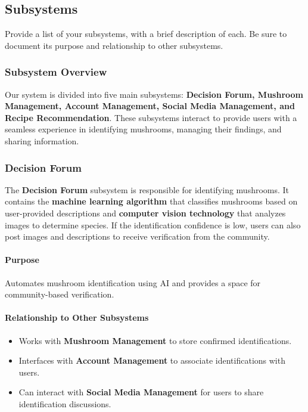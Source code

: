 \documentclass[]{article}
\begin{document}
\subsection{Subsystems}
\label{sub:subsystems}
 Provide a list of your subsystems, with a brief description of each. Be sure to document its purpose and relationship to other subsystems.
 \subsubsection{Subsystem Overview}
Our system is divided into five main subsystems: \textbf{Decision Forum, Mushroom Management, Account Management, Social Media Management, and Recipe Recommendation}. These subsystems interact to provide users with a seamless experience in identifying mushrooms, managing their findings, and sharing information.

\subsubsection{Decision Forum}
The \textbf{Decision Forum} subsystem is responsible for identifying mushrooms. It contains the \textbf{machine learning algorithm} that classifies mushrooms based on user-provided descriptions and \textbf{computer vision technology} that analyzes images to determine species. If the identification confidence is low, users can also post images and descriptions to receive verification from the community.

\paragraph{Purpose}
Automates mushroom identification using AI and provides a space for community-based verification.

\paragraph{Relationship to Other Subsystems}
\begin{itemize}
    \item Works with \textbf{Mushroom Management} to store confirmed identifications.
    \item Interfaces with \textbf{Account Management} to associate identifications with users.
    \item Can interact with \textbf{Social Media Management} for users to share identification discussions.
\end{itemize}
\end{document}
